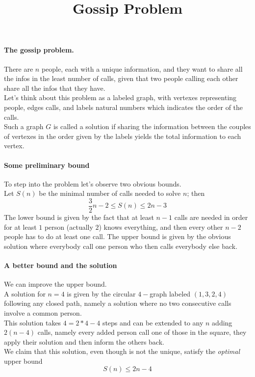 \documentclass{article}
\title{Gossip Problem}
\begin{document}
\paragraph{The gossip problem.\\}
There are $n$ people, each with a unique information, and they want to share all the infos in the least number of calls, given that two people calling each other share all the infos that they have.\\
Let's think about this problem as a labeled graph, with vertexes representing people, edges calls, and labels natural numbers which indicates the order of the calls.\\
Such a graph $G$ is called a solution if sharing the information between the couples of vertexes in the order given by the labels yields the total information to each vertex.
\paragraph{Some preliminary bound\\}
To step into the problem let's observe two obvious bounds.\\
Let $S(n)$ be the minimal number of calls needed to solve $n$; then
\begin{equation*}
\frac{3}{2}n-2\leq S(n)\leq 2n-3
\end{equation*}
The lower bound is given by the fact that at least $n-1$ calls are needed in order for at least $1$ person (actually $2$) knows everything, and then every other $n-2$ people has to do at least one call. The upper bound is given by the obvious solution where everybody call one person who then calls everybody else back.
\paragraph{A better bound and the solution\\}
We can improve the upper bound.\\
A solution for $n=4$ is given by the circular $4-$graph labeled $(1,3,2,4)$ following any closed path, namely a solution where no two consecutive calls involve a common person.\\
This solution takes $4=2*4-4$ steps and can be extended to any $n$ adding $2(n-4)$ calls, namely every added person call one of those in the square, they apply their solution and then inform the others back.\\
We claim that this solution, even though is not the unique, satisfy the \emph{optimal} upper bound \begin{equation*}
S(n)\leq 2n-4
\end{equation*}
\end{document}
